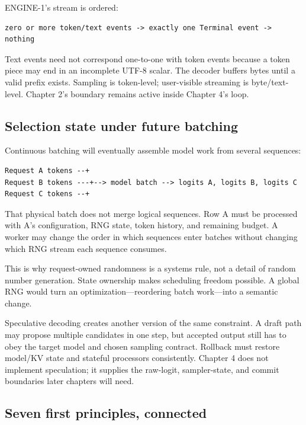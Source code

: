 \documentclass[
  10pt,
]{article}
\begin{document}
ENGINE-1's stream is ordered:

\begin{verbatim}
zero or more token/text events -> exactly one Terminal event -> nothing
\end{verbatim}

Text events need not correspond one-to-one with token events because a
token piece may end in an incomplete UTF-8 scalar. The decoder buffers
bytes until a valid prefix exists. Sampling is token-level; user-visible
streaming is byte/text-level. Chapter 2's boundary remains active inside
Chapter 4's loop.

\subsection{Selection state under future
batching}\label{selection-state-under-future-batching}

Continuous batching will eventually assemble model work from several
sequences:

\begin{verbatim}
Request A tokens --+
Request B tokens ---+--> model batch --> logits A, logits B, logits C
Request C tokens --+
\end{verbatim}

That physical batch does not merge logical sequences. Row A must be
processed with A's configuration, RNG state, token history, and
remaining budget. A worker may change the order in which sequences enter
batches without changing which RNG stream each sequence consumes.

This is why request-owned randomness is a systems rule, not a detail of
random number generation. State ownership makes scheduling freedom
possible. A global RNG would turn an optimization---reordering batch
work---into a semantic change.

Speculative decoding creates another version of the same constraint. A
draft path may propose multiple candidates in one step, but accepted
output still has to obey the target model and chosen sampling contract.
Rollback must restore model/KV state and stateful processors
consistently. Chapter 4 does not implement speculation; it supplies the
raw-logit, sampler-state, and commit boundaries later chapters will
need.

\subsection{Seven first principles,
connected}\label{seven-first-principles-connected}
\end{document}

